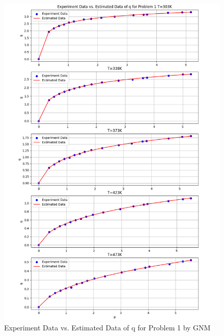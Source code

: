 \documentclass[12pt]{article} %
\begin{document}
\begin{figure}[ht]
    \centering
    \includegraphics[width=1\textwidth]{Q1_GMN_comp.png}
    \caption{Experiment Data vs. Estimated Data of q for Problem 1 by GNM}
\end{figure}
\clearpage
\end{document}
